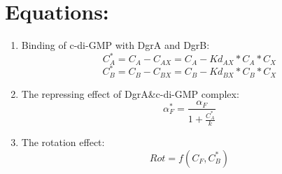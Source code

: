 \documentclass[UTF8]{ctexart}
\begin{document}
    \section{Equations:}
        \begin{enumerate}
        \item Binding of c-di-GMP with DgrA and DgrB: 
            $$C_{A}^{*} = C_{A} - C_{AX} = C_{A} - Kd_{AX}*C_{A}*C_{X}$$
            $$C_{B}^{*} = C_{B} - C_{BX} = C_{B} - Kd_{BX}*C_{B}*C_{X}$$
        \item The repressing effect of DgrA\&c-di-GMP complex: 
            $$\alpha^{*}_{F} = \frac{\alpha_{F}}{1+\frac{C_{A}^{*}}{k}}$$
        \item The rotation effect: 
            $$Rot = f(C_{F}, C_{B}^{*})$$
        \end{enumerate}
\end{document}
